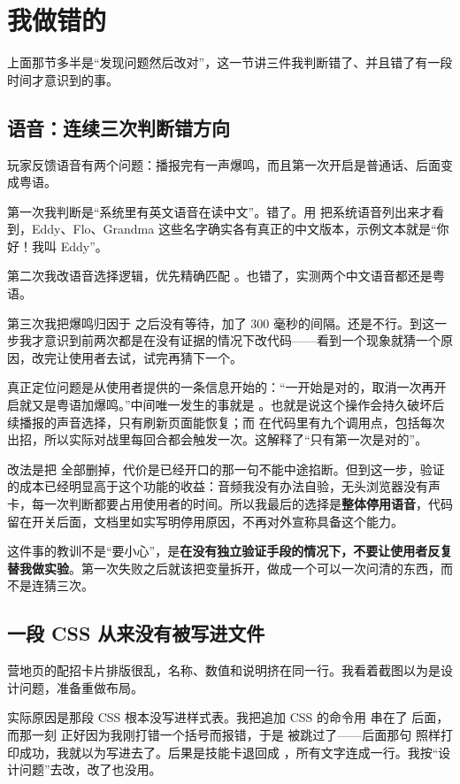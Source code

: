 \section{我做错的}

上面那节多半是“发现问题然后改对”，这一节讲三件我判断错了、并且错了有一段时间才意识到的事。

\subsection{语音：连续三次判断错方向}

玩家反馈语音有两个问题：播报完有一声爆鸣，而且第一次开启是普通话、后面变成粤语。

第一次我判断是“系统里有英文语音在读中文”。错了。用  把系统语音列出来才看到，Eddy、Flo、Grandma 这些名字确实各有真正的中文版本，示例文本就是“你好！我叫 Eddy”。

第二次我改语音选择逻辑，优先精确匹配 。也错了，实测两个中文语音都还是粤语。

第三次我把爆鸣归因于  之后没有等待，加了 300 毫秒的间隔。还是不行。到这一步我才意识到前两次都是在没有证据的情况下改代码——看到一个现象就猜一个原因，改完让使用者去试，试完再猜下一个。

真正定位问题是从使用者提供的一条信息开始的：“一开始是对的，取消一次再开启就又是粤语加爆鸣。”中间唯一发生的事就是 。也就是说这个操作会持久破坏后续播报的声音选择，只有刷新页面能恢复；而  在代码里有九个调用点，包括每次出招，所以实际对战里每回合都会触发一次。这解释了“只有第一次是对的”。

改法是把  全部删掉，代价是已经开口的那一句不能中途掐断。但到这一步，验证的成本已经明显高于这个功能的收益：音频我没有办法自验，无头浏览器没有声卡，每一次判断都要占用使用者的时间。所以我最后的选择是\textbf{整体停用语音}，代码留在开关后面，文档里如实写明停用原因，不再对外宣称具备这个能力。

这件事的教训不是“要小心”，是\textbf{在没有独立验证手段的情况下，不要让使用者反复替我做实验}。第一次失败之后就该把变量拆开，做成一个可以一次问清的东西，而不是连猜三次。

\subsection{一段 CSS 从来没有被写进文件}

营地页的配招卡片排版很乱，名称、数值和说明挤在同一行。我看着截图以为是设计问题，准备重做布局。

实际原因是那段 CSS 根本没写进样式表。我把追加 CSS 的命令用 \code{\&\&} 串在了  后面，而那一刻  正好因为我刚打错一个括号而报错，于是  被跳过了——后面那句  照样打印成功，我就以为写进去了。后果是技能卡退回成 ，所有文字连成一行。我按“设计问题”去改，改了也没用。

